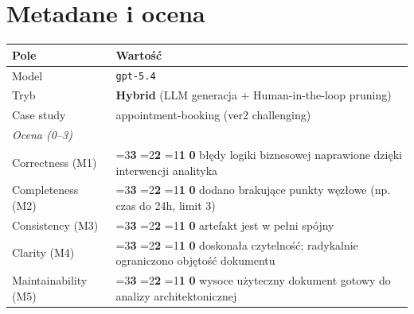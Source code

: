\documentclass[12pt,a4paper]{article}
\newcommand{\scorebox}[1]{%
  \ifnum#1=3\colorbox{score3}{\textbf{3}}%
  \else\ifnum#1=2\colorbox{score2}{\textbf{2}}%
  \else\ifnum#1=1\colorbox{score1}{\textbf{1}}%
  \else\colorbox{score0}{\textbf{0}}\fi\fi\fi
}
\begin{document}
\section{Metadane i ocena}
\begin{table}[h]
\begin{tabularx}{\textwidth}{l X}
\toprule
\textbf{Pole} & \textbf{Wartość} \\
\midrule
Model & \texttt{gpt-5.4} \\
Tryb & \textbf{Hybrid} (LLM generacja + Human-in-the-loop pruning) \\
Case study & appointment-booking (ver2 challenging) \\
\midrule
\multicolumn{2}{l}{\textit{Ocena (0--3)}} \\
\midrule
Correctness (M1)     & \scorebox{3} \quad błędy logiki biznesowej naprawione dzięki interwencji analityka \\
Completeness (M2)    & \scorebox{3} \quad dodano brakujące punkty węzłowe (np. czas do 24h, limit 3) \\
Consistency (M3)     & \scorebox{3} \quad artefakt jest w pełni spójny \\
Clarity (M4)         & \scorebox{3} \quad doskonała czytelność; radykalnie ograniczono objętość dokumentu \\
Maintainability (M5) & \scorebox{3} \quad wysoce użyteczny dokument gotowy do analizy architektonicznej \\
\bottomrule
\end{tabularx}
\end{table}
\end{document}
